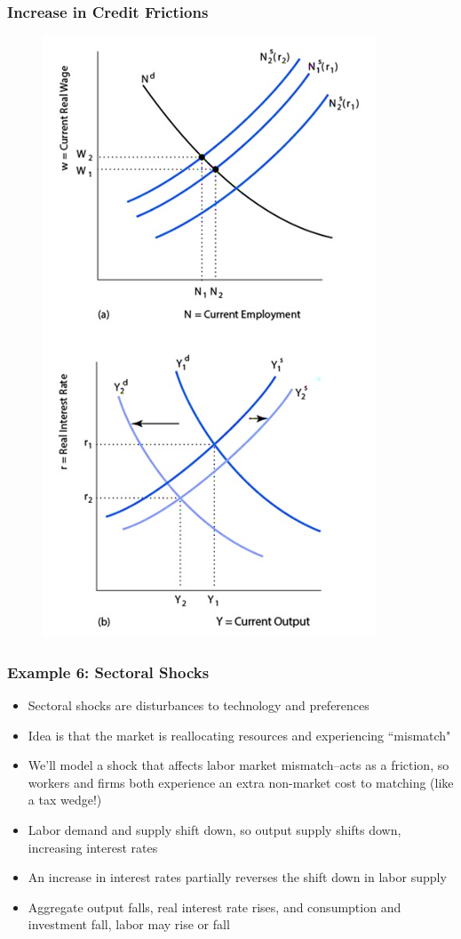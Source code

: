 \documentclass{beamer}
\begin{document}
\begin{frame} 
\frametitle[alignment=center]{Increase in Credit Frictions} 
\begin{figure}
\centering
\includegraphics[scale=0.65]{Figures/W_Fig_11pt29.png}
\end{figure}
\end{frame}

\begin{frame}
\frametitle[alignment=center]{Example 6: Sectoral Shocks} 
\begin{itemize}
\item Sectoral shocks are disturbances to technology and preferences
\bigskip
\item Idea is that the market is reallocating resources and experiencing ``mismatch"
\bigskip
\item We'll model a shock that affects labor market mismatch--acts as a friction, so workers and firms both experience an extra non-market cost to matching (like a tax wedge!)
\bigskip
\item Labor demand and supply shift down, so output supply shifts down, increasing interest rates
\bigskip
\item An increase in interest rates partially reverses the shift down in labor supply
\bigskip
\item Aggregate output falls, real interest rate rises, and consumption and investment fall, labor may rise or fall
\end{itemize}
\end{frame}
\end{document}
